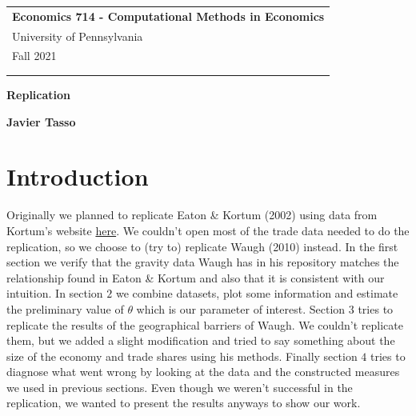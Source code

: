\documentclass[a4paper,12pt]{article}
\begin{document}
\begin{tabular}{p{15.5cm}} 
{\large \bf Economics 714 - Computational Methods in Economics} \\
University of Pennsylvania \\ Fall 2021 \\ \\ 
\hline 
\\
\end{tabular} 

\vspace*{0.3cm} 

\begin{center} 
	{\Large \bf Replication} 
	\vspace{2mm}
	
        
	{\bf Javier Tasso} 
		
\end{center}  

\vspace{0.4cm}



\section*{Introduction}

Originally we planned to replicate Eaton \& Kortum (2002) using data from Kortum's website \href{http://kortum.elisites.yale.edu/home/technology-geography-and-trade
}{here}. We couldn't open most of the trade data needed to do the replication, so we choose to (try to) replicate Waugh (2010) instead. In the first section we verify that the gravity data Waugh has in his repository matches the relationship found in Eaton \& Kortum and also that it is consistent with our intuition. In section $2$ we combine datasets, plot some information and estimate the preliminary value of $\theta$ which is our parameter of interest. Section $3$ tries to replicate the results of the geographical barriers of Waugh. We couldn't replicate them, but we added a slight modification and tried to say something about the size of the economy and trade shares using his methods. Finally section $4$ tries to diagnose what went wrong by looking at the data and the constructed measures we used in previous sections. Even though we weren't successful in the replication, we wanted to present the results anyways to show our work. 
\end{document}
